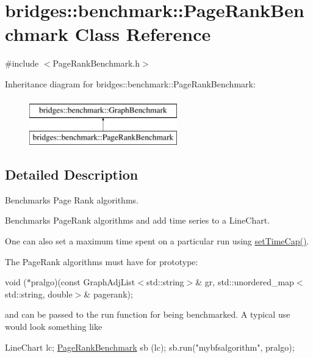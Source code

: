 \hypertarget{classbridges_1_1benchmark_1_1_page_rank_benchmark}{}\section{bridges\+:\+:benchmark\+:\+:Page\+Rank\+Benchmark Class Reference}
\label{classbridges_1_1benchmark_1_1_page_rank_benchmark}


{\ttfamily \#include $<$Page\+Rank\+Benchmark.\+h$>$}

Inheritance diagram for bridges\+:\+:benchmark\+:\+:Page\+Rank\+Benchmark\+:\begin{figure}[H]
\begin{center}
\leavevmode
\includegraphics[height=2.000000cm]{classbridges_1_1benchmark_1_1_page_rank_benchmark}
\end{center}
\end{figure}


\subsection{Detailed Description}
Benchmarks Page Rank algorithms. 

Benchmarks Page\+Rank algorithms and add time series to a Line\+Chart.

One can also set a maximum time spent on a particular run using \hyperlink{classbridges_1_1benchmark_1_1_graph_benchmark_a56934eb2789e54c088e7b4423c3a7456}{set\+Time\+Cap()}.

The Page\+Rank algorithms must have for prototype\+:

void ($\ast$pralgo)(const Graph\+Adj\+List$<$std\+::string$>$\& gr, std\+::unordered\+\_\+map$<$std\+::string, double$>$\& pagerank);

and can be passed to the run function for being benchmarked. A typical use would look something like


\begin{DoxyCode}
LineChart lc;
\hyperlink{classbridges_1_1benchmark_1_1_page_rank_benchmark_acdb9d6913f7559656aaae6c1f579d18b}{PageRankBenchmark} sb (lc);
sb.run(\textcolor{stringliteral}{"mybfsalgorithm"}, pralgo);
\end{DoxyCode}


